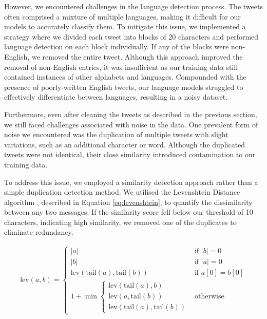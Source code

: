 However, we encountered challenges in the language detection process. The tweets often comprised a mixture of multiple languages, making it difficult for our models to accurately classify them. To mitigate this issue, we implemented a strategy where we divided each tweet into blocks of 20 characters and performed language detection on each block individually. If any of the blocks were non-English, we removed the entire tweet. Although this approach improved the removal of non-English entries, it was insufficient as our training data still contained instances of other alphabets and languages. Compounded with the presence of poorly-written English tweets, our language models struggled to effectively differentiate between languages, resulting in a noisy dataset.

Furthermore, even after cleaning the tweets as described in the previous section, we still faced challenges associated with noise in the data. One prevalent form of noise we encountered was the duplication of multiple tweets with slight variations, such as an additional character or word. Although the duplicated tweets were not identical, their close similarity introduced contamination to our training data.

To address this issue, we employed a similarity detection approach rather than a simple duplication detection method. We utilised the Levenshtein Distance algorithm \cite{levenshtein}, described in Equation \ref{eq:levenshtein}, to quantify the dissimilarity between any two messages. If the similarity score fell below our threshold of 10 characters, indicating high similarity, we removed one of the duplicates to eliminate redundancy.

\begin{equation}
    \begin{gathered}
        \text{lev}(a, b) = \begin{cases}
            |a|                                                      & \text{if } |b| = 0     \\
            |b|                                                      & \text{if } |a| = 0     \\
            \text{lev}(\text{tail}(a), \text{tail}(b))               & \text{if } a[0] = b[0] \\
            1 + \min \begin{cases}
                         \text{lev}(\text{tail}(a), b) \\
                         \text{lev}(a, \text{tail}(b)) \\
                         \text{lev}(\text{tail}(a), \text{tail}(b))
                     \end{cases} & \text{otherwise}
        \end{cases}
    \end{gathered}
    \label{eq:levenshtein}
\end{equation}

